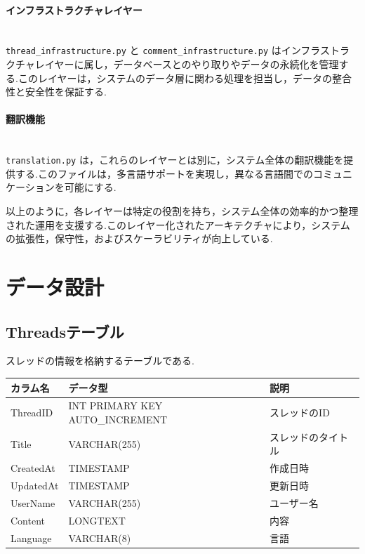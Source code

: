 \documentclass[b5paper,12pt]{jsreport}
\begin{document}
\paragraph{インフラストラクチャレイヤー}\mbox{}\\
\texttt{thread\_infrastructure.py} と \texttt{comment\_infrastructure.py} はインフラストラクチャレイヤーに属し，データベースとのやり取りやデータの永続化を管理する.このレイヤーは，システムのデータ層に関わる処理を担当し，データの整合性と安全性を保証する.

\paragraph{翻訳機能}\mbox{}\\
\texttt{translation.py} は，これらのレイヤーとは別に，システム全体の翻訳機能を提供する.このファイルは，多言語サポートを実現し，異なる言語間でのコミュニケーションを可能にする.

以上のように，各レイヤーは特定の役割を持ち，システム全体の効率的かつ整理された運用を支援する.このレイヤー化されたアーキテクチャにより，システムの拡張性，保守性，およびスケーラビリティが向上している.


\section{データ設計}

\subsection*{Threadsテーブル}

スレッドの情報を格納するテーブルである.

\begin{adjustbox}{width=\textwidth,center}
	\begin{tabular}{lll}
	\toprule
	\textbf{カラム名} & \textbf{データ型} & \textbf{説明} \\
	\midrule
	ThreadID   & INT PRIMARY KEY AUTO\_INCREMENT & スレッドのID \\
	Title      & VARCHAR(255) & スレッドのタイトル \\
	CreatedAt  & TIMESTAMP & 作成日時 \\
	UpdatedAt  & TIMESTAMP & 更新日時 \\
	UserName   & VARCHAR(255) & ユーザー名 \\
	Content    & LONGTEXT & 内容 \\
	Language   & VARCHAR(8) & 言語 \\
	\bottomrule
	\end{tabular}
\end{adjustbox}
\end{document}
